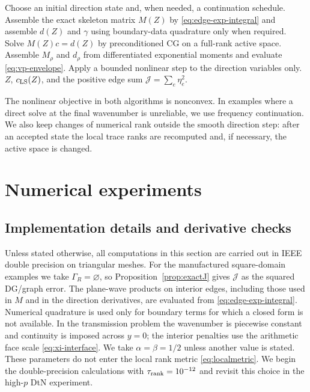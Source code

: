 \documentclass[pdflatex,sn-mathphys-num]{sn-jnl}
\theoremstyle{thmstyleone}
\theoremstyle{thmstyletwo}
\begin{document}
\begin{algorithm}[H]
\caption{Exact-edge variable-projection Trefftz least squares (Part B)}
\label{alg:varpro}
\begin{algorithmic}[1]
\State Choose an initial direction state and, when needed, a continuation schedule.
\Repeat
  \State Assemble the exact skeleton matrix $M(Z)$ by \eqref{eq:edge-exp-integral} and assemble $d(Z)$ and $\gamma$ using boundary-data quadrature only when required.
  \State Solve $M(Z)c=d(Z)$ by preconditioned CG on a full-rank active space.
  \State Assemble $M_\rho$ and $d_\rho$ from differentiated exponential moments and evaluate \eqref{eq:vp-envelope}.
  \State Apply a bounded nonlinear step to the direction variables only.
\State \Return $Z$, $c_{\rm LS}(Z)$, and the positive edge sum $\mathcal J=\sum_e\eta_e^2$.
\end{algorithmic}
\end{algorithm}

The nonlinear objective in both algorithms is nonconvex.  In examples where a direct solve at the final wavenumber is unreliable, we use frequency continuation.  We also keep changes of numerical rank outside the smooth direction step: after an accepted state the local trace ranks are recomputed and, if necessary, the active space is changed.

\section{Numerical experiments}\label{sec:numerics}

\subsection{Implementation details and derivative checks}
Unless stated otherwise, all computations in this section are carried out in IEEE double precision on triangular meshes.  For the manufactured square-domain examples we take $\Gamma_R=\varnothing$, so Proposition~\ref{prop:exactJ} gives $\mathcal J$ as the squared DG/graph error.  The plane-wave products on interior edges, including those used in $M$ and in the direction derivatives, are evaluated from \eqref{eq:edge-exp-integral}.  Numerical quadrature is used only for boundary terms for which a closed form is not available.  In the transmission problem the wavenumber is piecewise constant and continuity is imposed across $y=0$; the interior penalties use the arithmetic face scale \eqref{eq:xi-interface}.  We take $\alpha=\beta=1/2$ unless another value is stated.  These parameters do not enter the local rank metric \eqref{eq:localmetric}.  We begin the double-precision calculations with $\tau_{\rm rank}=10^{-12}$ and revisit this choice in the high-$p$ DtN experiment.
\end{document}
